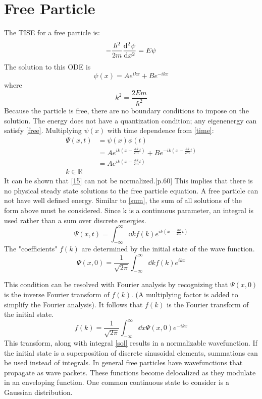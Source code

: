 \documentclass[twoside,twocolumn]{article}
\begin{document}
\section{Free Particle}
The TISE for a free particle is:
\begin{equation}
- \frac{\hbar^2}{2m} \dv[2]{\psi}{x} = E \psi
\label{free}
\end{equation}
The solution to this ODE is
\begin{equation}
	\psi(x) = Ae^{ikx} + Be^{-ikx}
\end{equation}
where
\begin{equation}
	k^2 = \frac{2Em}{\hbar ^2}
\end{equation}
Because the particle is free, there are no boundary conditions to impose on the solution. The energy does not have a quantization condition; any eigenenergy can satisfy \eqref{free}.
Multiplying $\psi(x)$ with time dependence from \eqref{time}:
\begin{equation}
	\begin{split}
		\Psi(x,t) &= \psi(x) \phi(t) \\
					       &= Ae^{ik(x - \frac{hk}{2m}t)} + Be^{-ik(x - \frac{hk}{2m}t)} \\
	    &= Ae^{ik(x - \frac{hk}{2m}t)} \\
k \in \mathbb{R}
	\end{split}
		\label{15}
\end{equation}	
It can be shown that \eqref{15} can not be normalized.\cite{q1}[p.60] This implies that there is no physical steady state solutions to the free particle equation. A free particle can not have well defined energy. Similar to \eqref{sum}, the sum of all solutions of the form above must be considered. Since k is a continuous parameter, an integral is used rather than a sum over discrete energies.
\begin{equation}
	\Psi(x,t) = \int_{-\infty}^{\infty} \dd{k} f(k) e^{ik(x - \frac{hk}{2m}t)}
	\label{sol}
\end{equation}
 The "coefficients" $f(k)$ are determined by the initial state of the wave function.
 \begin{equation}
	 \Psi(x,0) = \frac{1}{\sqrt{2\pi}}\int_{-\infty}^{\infty} \dd{k} f(k) e^{ikx}
 \end{equation}
 
This condition can be resolved with Fourier analysis by recognizing that $\Psi(x,0)$ is the inverse Fourier transform of $f(k)$. (A multiplying factor is added to simplify the Fourier analysis).  It follows that $f(k)$ is the Fourier transform of the initial state.
\begin{equation}
	f(k) = \frac{1}{\sqrt{2\pi}} \int_{-\infty}^{\infty}
	\dd{x} \Psi(x,0)e^{-ikx}
\end{equation}
This transform, along with integral \eqref{sol} results in a normalizable wavefunction. If the initial state is a superposition of discrete sinusoidal elements, summations can be used instead of integrals. In general free particles have wavefunctions that propagate as wave packets. These functions become delocalized as they modulate in an enveloping function. One common continuous state to consider is a Gaussian distribution.
\end{document}
